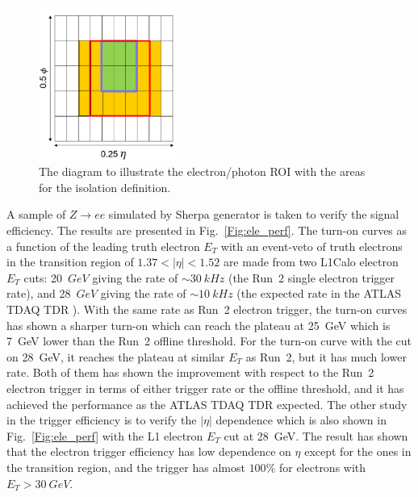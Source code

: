 \begin{figure}[!h]                
	\includegraphics[width=0.4\textwidth]{Chapter6/ele_iso.png}
	\begin{center}
		\caption{The diagram to illustrate the electron/photon ROI with the areas for the isolation definition.}
		\label{Fig:ele_iso}            
	\end{center}
\end{figure}
\noindent
A sample of $Z\to ee$ simulated by Sherpa generator is taken to verify the signal efficiency. The results are presented in Fig.~\ref{Fig:ele_perf}. The turn-on curves as a function of the leading truth electron $E_T$ with an event-veto of truth electrons in the transition region of $1.37<|\eta|<1.52$ are made from two L1Calo electron $E_{T}$ cuts: 20~$GeV$ giving the rate of $\sim30~kHz$ (the Run~2 single electron trigger rate), and 28~$GeV$ giving the rate of $\sim10~kHz$ (the expected rate in the ATLAS TDAQ TDR \cite{Aad:1602235}). With the same rate as Run~2 electron trigger, the turn-on curves has shown a sharper turn-on which can reach the plateau at 25~GeV which is 7~GeV lower than the Run~2 offline threshold. For the turn-on curve with the cut on 28~GeV, it reaches the plateau at similar $E_{T}$ as Run~2, but it has much lower rate. Both of them has shown the improvement with respect to the Run~2 electron trigger in terms of either trigger rate or the offline threshold, and it has achieved the performance as the ATLAS TDAQ TDR\cite{Aad:1602235} expected. The other study in the trigger efficiency is to verify the $|\eta|$ dependence which is also shown in Fig.~\ref{Fig:ele_perf} with the L1 electron $E_{T}$ cut at 28~GeV. The result has shown that the electron trigger efficiency has low dependence on $\eta$ except for the ones in the transition region, and the trigger has almost $100\%$ for electrons with $E_{T}>30~GeV$.
